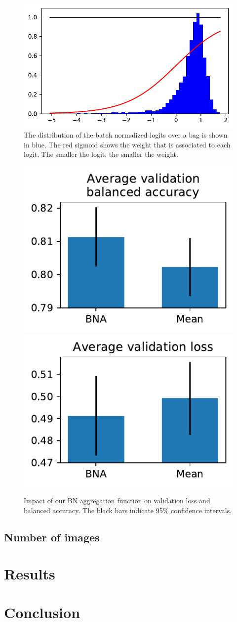 \documentclass[final]{cvpr}
\begin{document}
\begin{figure}[t]
	\begin{center}
		\includegraphics[width=0.95\linewidth]{aggreg_2.pdf}
	\end{center}
	\caption{The distribution of the batch normalized logits over a bag is shown in blue. The red sigmoid shows the weight that is associated to each logit. The smaller the logit, the smaller the weight.}
	\label{fig:aggreg}
\end{figure}

\begin{figure}[t]
	\begin{center}
		\includegraphics[width=0.47\linewidth]{agg_bal_acc.pdf}
		\includegraphics[width=0.47\linewidth]{agg_val_loss.pdf}
	\end{center}
	\caption{Impact of our BN aggregation function on validation loss and balanced accuracy.  The black bars indicate 95\% confidence intervals.}
	\label{fig:resnet}
\end{figure}



\subsection{Number of images}
	
	\section{Results}
	
	\section{Conclusion}
	
	
	{\small
		
		
	}
\end{document}
